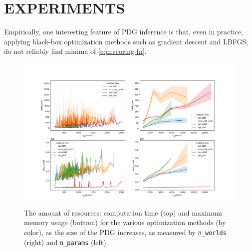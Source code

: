 \documentclass[twoside]{article}
\begin{document}
\section{EXPERIMENTS} \label{sec:expts}

Empirically, one interesting feature of PDG inference is that, even in practice, applying black-box optimization methods such as gradient descent and LBFGS, do not reliably find minima of \eqref{eqn:scoring-fn}.

\begin{figure}
    \includegraphics[width=\linewidth]{figs/resources-fine}
    \caption{
        The amount of resources: computation time (top) and maximum memory usage (bottom) for the various optimization methods (by color), as the size of the PDG increases, as measured by \texttt{n\_worlds} (right) and \texttt{n\_params} (left).
     }\label{fig:resources}
\end{figure}
\end{document}
